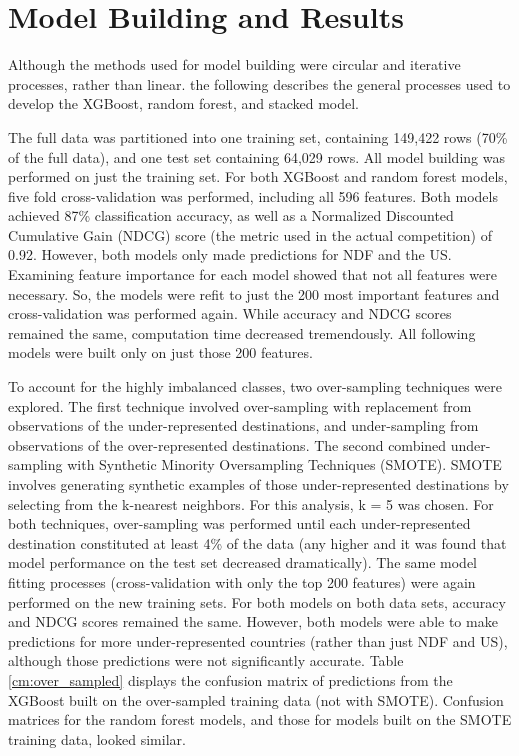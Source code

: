 \documentclass{article}
\begin{document}
\section{Model Building and Results}

Although the methods used for model building were circular and iterative processes, rather than linear. the following describes the general processes used to develop the XGBoost, random forest, and stacked model. 

The full data was partitioned into one training set, containing 149,422 rows (70\% of the full data), and one 
test set containing 64,029 rows. All model building was performed on just the training set. For both XGBoost and random forest models, five fold cross-validation was performed, including all 596 features. Both models achieved 87\% classification accuracy, as well as a Normalized Discounted Cumulative Gain (NDCG) score (the metric used in the actual competition) of 0.92. However, both models only made predictions for NDF and the US. Examining feature importance for each model showed that not all features were necessary. So, the models were refit to just the 200 most important features and cross-validation was performed again. While accuracy and NDCG scores remained the same, computation time decreased tremendously. All following models were built only on just those 200 features. 

To account for the highly imbalanced classes, two over-sampling techniques were explored. The first technique involved over-sampling with replacement from observations of the under-represented destinations, and under-sampling from observations of the over-represented destinations. The second combined under-sampling with Synthetic Minority Oversampling Techniques (SMOTE). SMOTE involves generating synthetic examples of those under-represented destinations by selecting from the k-nearest neighbors. For this analysis, k = 5 was chosen. For both techniques, over-sampling was performed until each under-represented destination constituted at least 4\% of the data (any higher and it was found that model performance on the test set decreased dramatically). The same model fitting processes (cross-validation with only the top 200 features) were again performed on the new training sets. For both models on both data sets, accuracy and NDCG scores remained the same. However, both models were able to make predictions for more under-represented countries (rather than just NDF and US), although those predictions were not significantly accurate. Table \ref{cm:over_sampled} displays the confusion matrix of predictions from the XGBoost built on the over-sampled training data (not with SMOTE). Confusion matrices for the random forest models, and those for models built on the SMOTE training data, looked similar. 
\end{document}
